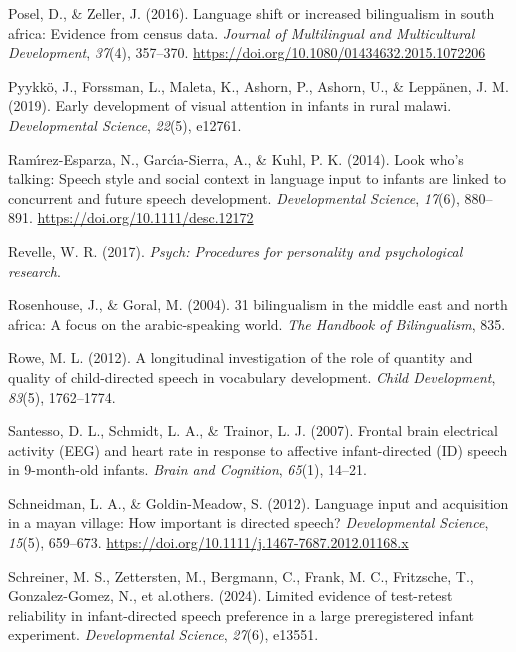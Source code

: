 \documentclass[
  ,man,floatsintext]{apa6}
\newlength{\cslhangindent}
\newlength{\cslentryspacingunit} %
\newenvironment{CSLReferences}[2] %
 {%
  \setlength{\parindent}{0pt}
  \ifodd #1
  \let\oldpar\par
  \def\par{\hangindent=\cslhangindent\oldpar}
  \fi
  \setlength{\parskip}{#2\cslentryspacingunit}
 }%
 {}
\begin{document}
\begin{CSLReferences}{1}{0}
\leavevmode{}%
Posel, D., \& Zeller, J. (2016). Language shift or increased bilingualism in south africa: Evidence from census data. \emph{Journal of Multilingual and Multicultural Development}, \emph{37}(4), 357--370. \url{https://doi.org/10.1080/01434632.2015.1072206}

\leavevmode{}%
Pyykkö, J., Forssman, L., Maleta, K., Ashorn, P., Ashorn, U., \& Leppänen, J. M. (2019). Early development of visual attention in infants in rural malawi. \emph{Developmental Science}, \emph{22}(5), e12761.

\leavevmode{}%
Ramı́rez-Esparza, N., Garcı́a-Sierra, A., \& Kuhl, P. K. (2014). Look who's talking: Speech style and social context in language input to infants are linked to concurrent and future speech development. \emph{Developmental Science}, \emph{17}(6), 880--891. \url{https://doi.org/10.1111/desc.12172}

\leavevmode{}%
Revelle, W. R. (2017). \emph{Psych: Procedures for personality and psychological research}.

\leavevmode{}%
Rosenhouse, J., \& Goral, M. (2004). 31 bilingualism in the middle east and north africa: A focus on the arabic-speaking world. \emph{The Handbook of Bilingualism}, 835.

\leavevmode{}%
Rowe, M. L. (2012). A longitudinal investigation of the role of quantity and quality of child-directed speech in vocabulary development. \emph{Child Development}, \emph{83}(5), 1762--1774.

\leavevmode{}%
Santesso, D. L., Schmidt, L. A., \& Trainor, L. J. (2007). Frontal brain electrical activity (EEG) and heart rate in response to affective infant-directed (ID) speech in 9-month-old infants. \emph{Brain and Cognition}, \emph{65}(1), 14--21.

\leavevmode{}%
Schneidman, L. A., \& Goldin-Meadow, S. (2012). Language input and acquisition in a mayan village: How important is directed speech? \emph{Developmental Science}, \emph{15}(5), 659--673. \url{https://doi.org/10.1111/j.1467-7687.2012.01168.x}

\leavevmode{}%
Schreiner, M. S., Zettersten, M., Bergmann, C., Frank, M. C., Fritzsche, T., Gonzalez-Gomez, N., et al.others. (2024). Limited evidence of test-retest reliability in infant-directed speech preference in a large preregistered infant experiment. \emph{Developmental Science}, \emph{27}(6), e13551.


\end{CSLReferences}
\end{document}
